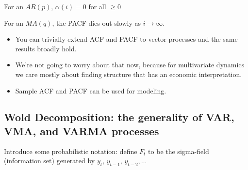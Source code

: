 \begin{description}
  For an $AR(p)$, $\alpha(i) = 0$ for all $ \geq 0$

  For an $MA(q)$, the PACF dies out slowly as $i \to \infty$.
\end{description}

\begin{itemize}
\item You can trivially extend ACF and PACF to vector processes and
  the same results broadly hold.
\item We're not going to worry about that now, because for
  multivariate dynamics we care mostly about finding structure that
  has an economic interpretation.
\item Sample ACF and PACF can be used for modeling.
\end{itemize}

\subsection{Wold Decomposition: the generality of VAR, VMA, and VARMA
  processes}

Introduce some probabilistic notation: define $F_t$ to be the sigma-field
(information set) generated by $y_t$, $y_{t-1}$, $y_{t-2},\dots$

